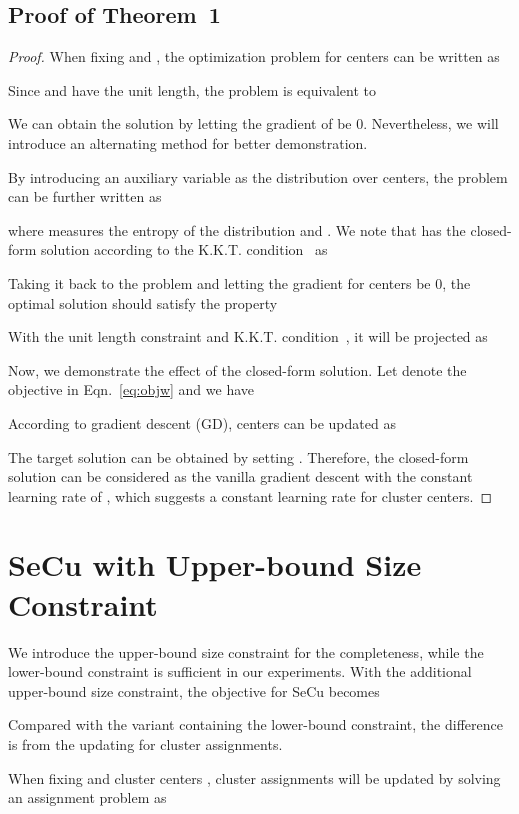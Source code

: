 \documentclass[10pt,twocolumn,letterpaper]{article}
\begin{document}
\subsection{Proof of Theorem~1}
\begin{proof}
When fixing  and , the optimization problem for centers can be written as

Since  and  have the unit length, the problem is equivalent to

We can obtain the solution by letting the gradient of  be 0. Nevertheless, we will introduce an alternating method for better demonstration.


By introducing an auxiliary variable  as the distribution over centers, the problem can be further written as

where  measures the entropy of the distribution and . 
We note that  has the closed-form solution according to the K.K.T. condition~\cite{boyd2004convex} as

Taking it back to the problem and letting the gradient for centers be 0, the optimal solution  should satisfy the property

With the unit length constraint and K.K.T. condition~\cite{boyd2004convex}, it will be projected as


Now, we demonstrate the effect of the closed-form solution. Let  denote the objective in Eqn.~\ref{eq:objw} and we have

According to gradient descent (GD), centers can be updated as

The target solution can be obtained by setting . Therefore, the closed-form solution can be considered as the vanilla gradient descent with the constant learning rate of , which suggests a constant learning rate for cluster centers.
\end{proof}


\section{SeCu with Upper-bound Size Constraint}
We introduce the upper-bound size constraint for the completeness, while the lower-bound constraint is sufficient in our experiments. With the additional upper-bound size constraint, the objective for SeCu becomes


Compared with the variant containing the lower-bound constraint, the difference is from the updating for cluster assignments.

When fixing  and cluster centers , cluster assignments will be updated by solving an assignment problem as
\end{document}
